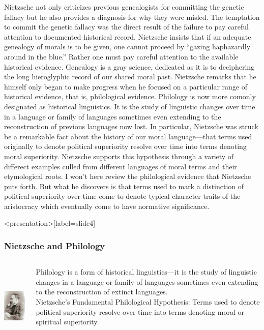 Nietzsche not only criticizes previous genealogists for committing the genetic fallacy but he also provides a diagnosis for why they were misled. The temptation to commit the genetic fallacy was the direct result of the failure to pay careful attention to documented historical record. Nietzsche insists that if an adequate genealogy of morals is to be given, one cannot proceed by  ``gazing haphazardly around in the blue.'' Rather  one must pay careful attention to the available historical evidence. Genealogy is a gray science, dedicated as it is to deciphering the long hieroglyphic record of our shared moral past. Nietzsche remarks that he himself only began to make progress when he focused on a particular range of historical evidence, that is, philological evidence. Philology is now more comonly designated as historical linguistics. It is the study of linguistic changes over time in a language or family of languages sometimes even extending to the reconstruction of previous languages now lost. In particular, Nietzsche was struck be a remarkable fact about the history of our moral language---that terms used originally to denote political superiority resolve over time into terms denoting moral superiority. Nietzsche supports this hypothesis through a variety of differect examples culled from different languages of moral terms and their etymological roots. I won't here review the philological evidence that Nietzsche puts forth. But what he discovers is that terms used to mark a distinction of political superiority over time come to denote typical character traits  of the aristocracy which eventually come to have normative significance. \change

\begin{frame}<presentation>[label=slide4]
    \frametitle{Nietzsche and Philology}
        \begin{columns}
            \begin{column}{3cm}
                \includegraphics[height=4cm]{../../../graphics/nietzsche.jpg}
            \end{column}
            \begin{column}{7cm}
                \alert{Philology} is a form of historical linguistics---it is the study of linguistic changes in a language or family of languages sometimes even extending to the reconstruction of extinct languages.\\
                \alert{Nietzsche's Fundamental Philological Hypothesis}: Terms used to denote political superiority resolve over time into terms denoting moral or spiritual superiority.
            \end{column}
        \end{columns}
\end{frame}

